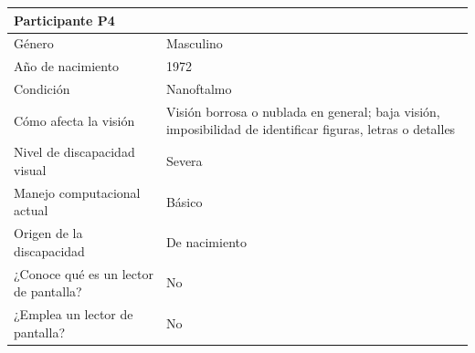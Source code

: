 \begin{longtable}{|p{4cm}|p{10.5cm}|}
    \multicolumn{2}{|l|}{\textbf{Participante P4}} \\
    \hline
    Género & Masculino \\
    \hline
    Año de nacimiento & 1972 \\
    \hline
    Condición & Nanoftalmo \\
    \hline
    Cómo afecta la visión & Visión borrosa o nublada en general; baja visión, imposibilidad de identificar figuras, letras o detalles \\
    \hline
    Nivel de discapacidad visual & Severa \\
    \hline
    Manejo computacional actual & Básico \\
    \hline
    Origen de la discapacidad & De nacimiento \\
    \hline
    ¿Conoce qué es un lector de pantalla? & No \\
    \hline
    ¿Emplea un lector de pantalla? & No \\
    \hline


\end{longtable}
